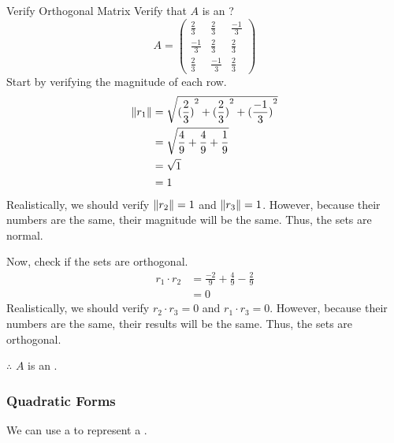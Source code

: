 \begin{example}{Verify Orthogonal Matrix}
  Verify that $A$ is an ?
  \begin{equation*}
    A =
    \begin{pmatrix}
      \frac{2}{3} & \frac{2}{3} & \frac{-1}{3} \\
      \frac{-1}{3} & \frac{2}{3} & \frac{2}{3} \\
      \frac{2}{3} & \frac{-1}{3} & \frac{2}{3}
    \end{pmatrix}
  \end{equation*}
  \tcblower{}
  Start by verifying the magnitude of each row.
  \begin{align*}
    \lVert r_{1} \rVert &= \sqrt{{(\frac{2}{3})}^{2} + {(\frac{2}{3})}^{2} + {(\frac{-1}{3})}^{2}} \\
                      &= \sqrt{\frac{4}{9} + \frac{4}{9} + \frac{1}{9}} \\
                      &= \sqrt{1} \\
                      &= 1
  \end{align*}
  Realistically, we should verify $\lVert r_{2} \rVert = 1$ and $\lVert r_{3} \rVert = 1$.
  However, because their numbers are the same, their magnitude will be the same.
  Thus, the sets are normal.

  Now, check if the sets are orthogonal.
  \begin{align*}
    r_{1} \cdot r_{2} &= \frac{-2}{9} + \frac{4}{9} - \frac{2}{9} \\
                     &= 0
  \end{align*}
  Realistically, we should verify $r_{2} \cdot r_{3} = 0$ and $r_{1} \cdot r_{3} = 0$.
  However, because their numbers are the same, their results will be the same.
  Thus, the sets are orthogonal.

  $\therefore$ $A$ is an .
\end{example}

\subsubsection{Quadratic Forms}\label{subsubsec:Quadratic_Forms}
We can use a  to represent a .


